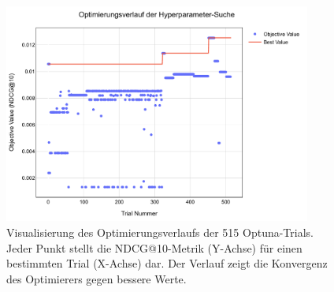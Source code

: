 
\begin{figure}[H]
    \centering
    \includegraphics[width=0.9\textwidth]{content/figures/svg/optimierungsverlauf.pdf}
    \caption{Visualisierung des Optimierungsverlaufs der 515 Optuna-Trials. Jeder Punkt stellt die NDCG@10-Metrik (Y-Achse) für einen bestimmten Trial (X-Achse) dar. Der Verlauf zeigt die Konvergenz des Optimierers gegen bessere Werte.}
    \label{fig:optimierungsverlauf}
\end{figure}